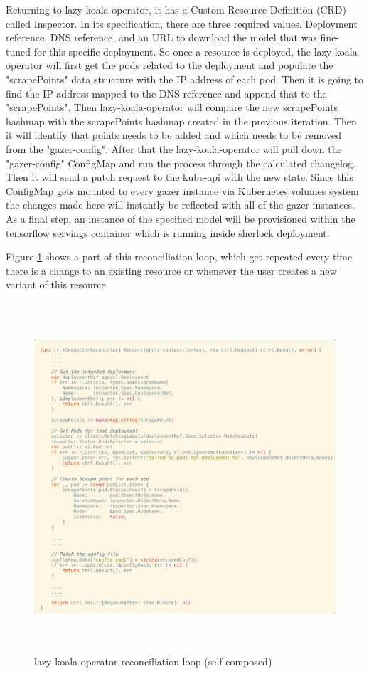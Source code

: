Returning to \ac{lazy-koala-operator}, it has a Custom Resource Definition (CRD) called Inspector. In its specification, there are three required values. Deployment reference, DNS reference, and an URL to download the model that was fine-tuned for this specific deployment. So once a resource is deployed, the \ac{lazy-koala-operator} will first get the pods related to the deployment and populate the "scrapePoints" data structure with the IP address of each pod. Then it is going to find the IP address mapped to the DNS reference and append that to the "scrapePoints". Then \ac{lazy-koala-operator} will compare the new scrapePoints hashmap with the scrapePoints hashmap created in the previous iteration. Then it will identify that points needs to be added and which needs to be removed from the "gazer-config". After that the \ac{lazy-koala-operator} will pull down the "gazer-config" ConfigMap and run the process through the calculated changelog. Then it will send a patch request to the kube-api with the new state. Since this ConfigMap gets mounted to every \ac{gazer} instance via Kubernetes volumes system the changes made here will instantly be reflected with all of the \ac{gazer} instances. As a final step, an instance of the specified model  will be provisioned within the tensorflow servings container which is running inside \ac{sherlock} deployment.

Figure \ref{fig:reconcile-loop} shows a part of this reconciliation loop, which get repeated every time there is a change to an existing resource or whenever the user creates a new variant of this resource.

\begin{figure}[H]
    \includegraphics[height=13cm]{assets/implementation/reconcile-loop.png}
    \caption{\ac{lazy-koala-operator} reconciliation loop (self-composed)}
    \label{fig:reconcile-loop}
\end{figure}



